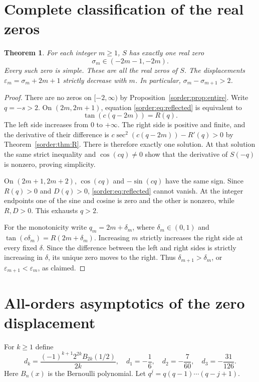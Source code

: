 \documentclass[11pt,a4paper]{article}
\newtheorem{theorem}{Theorem}[section]
\theoremstyle{definition}
\theoremstyle{remark}
\numberwithin{equation}{section}
\begin{document}
\section{Complete classification of the real zeros}

\begin{theorem}\label{sorder:thm:all-real-zeros}
For each integer $m\ge1$, $S$ has exactly one real zero
\[
 \sigma_m\in(-2m-1,-2m).
\]
Every such zero is simple. These are all the real zeros of $S$.
The displacements $\varepsilon_m=\sigma_m+2m+1$ strictly decrease
with $m$. In particular, $\sigma_m-\sigma_{m+1}>2$.
\end{theorem}
\begin{proof}
There are no zeros on $[-2,\infty)$ by
Proposition~\ref{sorder:prop:entire}. Write $q=-s>2$.
On $(2m,2m+1)$, equation \eqref{sorder:eq:reflected} is equivalent to
\[
 \tan(c(q-2m))=R(q).
\]
The left side increases from $0$ to $+\infty$. The right side is
positive and finite, and the derivative of their difference is
$c\sec^2(c(q-2m))-R'(q)>0$ by Theorem~\ref{sorder:thm:R}.
There is therefore exactly one solution. At that solution the same
strict inequality and $\cos(cq)\ne0$ show that the derivative of
$S(-q)$ is nonzero, proving simplicity.

On $(2m+1,2m+2)$, $\cos(cq)$ and $-\sin(cq)$ have the same sign.
Since $R(q)>0$ and $D(q)>0$, \eqref{sorder:eq:reflected} cannot vanish.
At the integer endpoints one of the sine and cosine is zero and the
other is nonzero, while $R,D>0$. This exhausts $q>2$.

For the monotonicity write $q_m=2m+\delta_m$, where
$\delta_m\in(0,1)$ and $\tan(c\delta_m)=R(2m+\delta_m)$.
Increasing $m$ strictly increases the right side at every fixed
$\delta$. Since the difference between the left and right sides is
strictly increasing in $\delta$, its unique zero moves to the right.
Thus $\delta_{m+1}>\delta_m$, or
$\varepsilon_{m+1}<\varepsilon_m$, as claimed.
\end{proof}

\section{All-orders asymptotics of the zero displacement}

For $k\ge1$ define
\[
 d_k=\frac{(-1)^{k+1}2^{2k}B_{2k}(1/2)}{2k},
 \quad d_1=-\frac16,\quad d_2=-\frac7{60},\quad d_3=-\frac{31}{126}.
\]
Here $B_n(x)$ is the Bernoulli polynomial. Let
$q^{\underline j}=q(q-1)\cdots(q-j+1)$.
\end{document}
